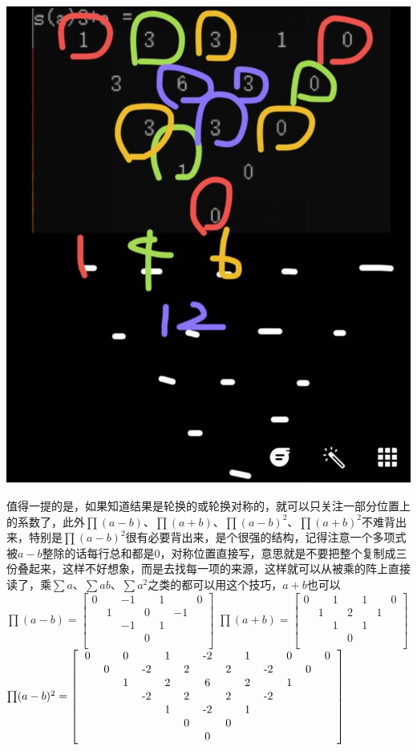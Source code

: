 \documentclass[UTF8]{ctexart}
\begin{document}
\begin{center}
	\includegraphics[width=0.35\linewidth]{09}
\end{center}
值得一提的是，如果知道结果是轮换的或轮换对称的，就可以只关注一部分位置上的系数了，此外$ \prod (a-b) $、$ \prod (a+b) $、$\prod (a-b)^{2} $、$ \prod (a+b)^{2} $不难背出来，特别是$ \prod (a-b)^{2} $很有必要背出来，是个很强的结构，记得注意一个多项式被$ a-b $整除的话每行总和都是$ 0 $，对称位置直接写，意思就是不要把整个复制成三份叠起来，这样不好想象，而是去找每一项的来源，这样就可以从被乘的阵上直接读了，乘$ \displaystyle \sum a $、$ \displaystyle \sum ab $、$ \displaystyle \sum a^{2} $之类的都可以用这个技巧，$ a+b $也可以\\
$ \prod (a-b)=\left[\begin{matrix}
	0& &-1& &1& &0\\
	&1& &0& &-1&\\
	& &-1& &1& & \\
	& & &0& & &\\
\end{matrix}\right] $
$ \prod (a+b)= \left[\begin{matrix}
	0& &1& &1& &0\\
	&1& &2& &1&\\
	& &1& &1& & \\
	& & &0& & &\\
\end{matrix}\right]$\\
$\prod (a-b)^{2}=
\left[\begin{matrix}
	\begin{tabular}{ccccccccccccc}
		0& &0& &1& &-2& &1& &0& &0\\
		&0& &-2& &2& &2& &-2& &0&\\
		& &1& &2& &6& &2& &1& &\\
		& & &-2& &2& &2& &-2& & &\\
		& & & &1& &-2& &1& & & &\\
		& & & & &0& &0& & & & &\\
		& & & & & &0& & & & & &\\
	\end{tabular}
\end{matrix}\right]$\\
\end{document}
